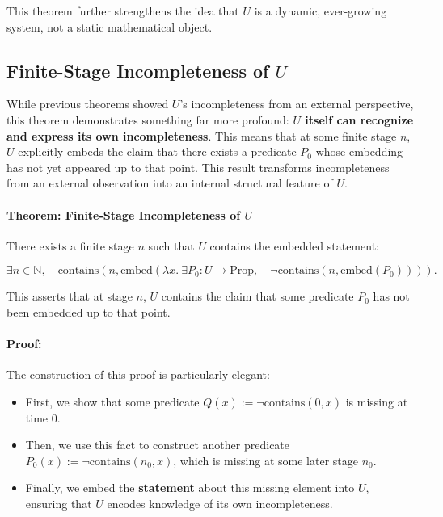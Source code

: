 \documentclass[12pt]{article}
\begin{document}
This theorem further strengthens the idea that \( U \) is a dynamic, ever-growing system, not a static mathematical object.


\subsection{Finite-Stage Incompleteness of \( U \)}

While previous theorems showed \( U \)'s incompleteness from an external perspective, this theorem demonstrates something far more profound: \textbf{\( U \) itself can recognize and express its own incompleteness}. This means that at some finite stage \( n \), \( U \) explicitly embeds the claim that there exists a predicate \( P_0 \) whose embedding has not yet appeared up to that point. This result transforms incompleteness from an external observation into an internal structural feature of \( U \).

\paragraph{Theorem: Finite-Stage Incompleteness of \( U \)}
There exists a finite stage \( n \) such that \( U \) contains the embedded statement:

\begin{equation}
    \exists n \in \mathbb{N}, \quad
    \text{contains}(n, \text{embed}(\lambda x.\ \exists P_0: U \to \text{Prop}, \quad \neg \text{contains}(n, \text{embed}(P_0)))).
\end{equation}

This asserts that at stage \( n \), \( U \) contains the claim that some predicate \( P_0 \) has not been embedded up to that point.

\paragraph{Proof:}
The construction of this proof is particularly elegant:
\begin{itemize}
    \item First, we show that some predicate \( Q(x) := \neg \text{contains}(0, x) \) is missing at time \( 0 \).
    \item Then, we use this fact to construct another predicate \( P_0(x) := \neg \text{contains}(n_0, x) \), which is missing at some later stage \( n_0 \).
    \item Finally, we embed the \textbf{statement} about this missing element into \( U \), ensuring that \( U \) encodes knowledge of its own incompleteness.
\end{itemize}
\end{document}
